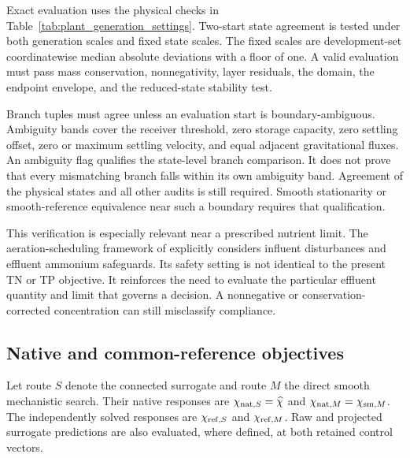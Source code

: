 Exact evaluation uses the physical checks in Table~\ref{tab:plant_generation_settings}. Two-start state agreement is tested under both generation scales and fixed state scales. The fixed scales are development-set coordinatewise median absolute deviations with a floor of one. A valid evaluation must pass mass conservation, nonnegativity, layer residuals, the domain, the endpoint envelope, and the reduced-state stability test.

Branch tuples must agree unless an evaluation start is boundary-ambiguous. Ambiguity bands cover the receiver threshold, zero storage capacity, zero settling offset, zero or maximum settling velocity, and equal adjacent gravitational fluxes. An ambiguity flag qualifies the state-level branch comparison. It does not prove that every mismatching branch falls within its own ambiguity band. Agreement of the physical states and all other audits is still required. Smooth stationarity or smooth-reference equivalence near such a boundary requires that qualification.

This verification is especially relevant near a prescribed nutrient limit. The aeration-scheduling framework of \citet{Ren2026} explicitly considers influent disturbances and effluent ammonium safeguards. Its safety setting is not identical to the present TN or TP objective. It reinforces the need to evaluate the particular effluent quantity and limit that governs a decision. A nonnegative or conservation-corrected concentration can still misclassify compliance.

\subsection{Native and common-reference objectives}

Let route $S$ denote the connected surrogate and route $M$ the direct smooth mechanistic search. Their native responses are $\chi_{{\rm nat},S}=\widehat\chi$ and $\chi_{{\rm nat},M}=\chi_{{\rm sm},M}$. The independently solved responses are $\chi_{{\rm ref},S}$ and $\chi_{{\rm ref},M}$. Raw and projected surrogate predictions are also evaluated, where defined, at both retained control vectors.

